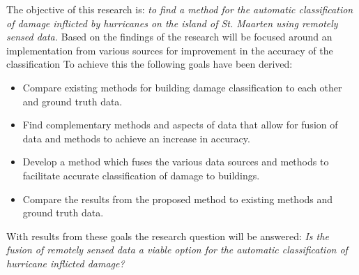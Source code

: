 The objective of this research is: \textit{to find a method for the automatic classification of damage inflicted by hurricanes on the island of St. Maarten using remotely sensed data.} Based on the findings of \citet{Kakooei2017} the research will be focused around an implementation from various sources for improvement in the accuracy of the classification To achieve this the following goals have been derived:

\begin{itemize}
	\item Compare existing methods for building damage classification to each other and ground truth data.
	\item Find complementary methods and aspects of data that allow for fusion of data and methods to achieve an increase in accuracy.
	\item Develop a method which fuses the various data sources and methods to facilitate accurate classification of damage to buildings. 
	\item Compare the results from the proposed method to existing methods and ground truth data.
\end{itemize}

With results from these goals the research question will be answered: \textit{Is the fusion of remotely sensed data a viable option for the automatic classification of hurricane inflicted damage?}\\

